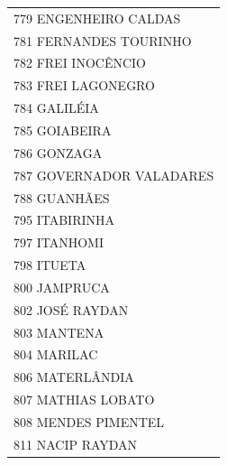 \documentclass{article}
\begin{document}
\begin{longtable}[c]{m{18cm}}
\multicolumn{1}{l}{ \hspace{2em} 779 ENGENHEIRO CALDAS } \\
\multicolumn{1}{l}{ \hspace{2em} 781 FERNANDES TOURINHO } \\
\multicolumn{1}{l}{ \hspace{2em} 782 FREI INOCÊNCIO } \\
\multicolumn{1}{l}{ \hspace{2em} 783 FREI LAGONEGRO } \\
\multicolumn{1}{l}{ \hspace{2em} 784 GALILÉIA } \\
\multicolumn{1}{l}{ \hspace{2em} 785 GOIABEIRA } \\
\multicolumn{1}{l}{ \hspace{2em} 786 GONZAGA } \\
\multicolumn{1}{l}{ \hspace{2em} 787 GOVERNADOR VALADARES } \\
\multicolumn{1}{l}{ \hspace{2em} 788 GUANHÃES } \\
\multicolumn{1}{l}{ \hspace{2em} 795 ITABIRINHA } \\
\multicolumn{1}{l}{ \hspace{2em} 797 ITANHOMI } \\
\multicolumn{1}{l}{ \hspace{2em} 798 ITUETA } \\
\multicolumn{1}{l}{ \hspace{2em} 800 JAMPRUCA } \\
\multicolumn{1}{l}{ \hspace{2em} 802 JOSÉ RAYDAN } \\
\multicolumn{1}{l}{ \hspace{2em} 803 MANTENA } \\
\multicolumn{1}{l}{ \hspace{2em} 804 MARILAC } \\
\multicolumn{1}{l}{ \hspace{2em} 806 MATERLÂNDIA } \\
\multicolumn{1}{l}{ \hspace{2em} 807 MATHIAS LOBATO } \\
\multicolumn{1}{l}{ \hspace{2em} 808 MENDES PIMENTEL } \\
\multicolumn{1}{l}{ \hspace{2em} 811 NACIP RAYDAN } \\

\end{longtable}
\end{document}
